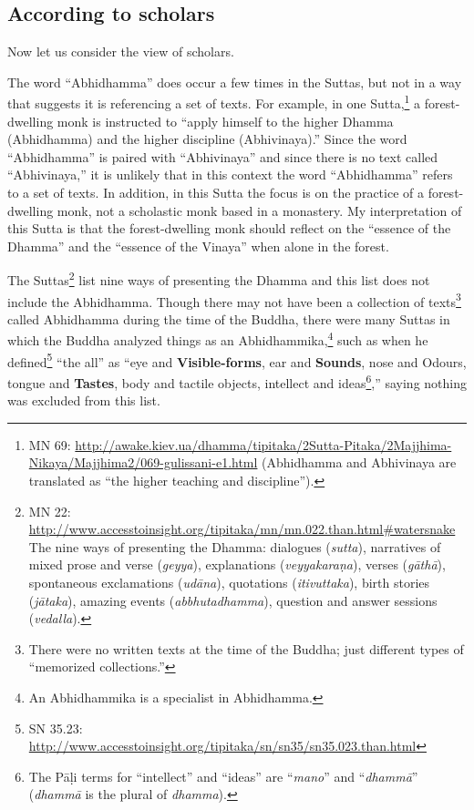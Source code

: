 \subsection*{According to scholars}

Now let us consider the view of scholars. 

The word “Abhidhamma” does occur a few times in the Suttas, but not in a way that suggests it is referencing a set of texts. For example, in one Sutta,\footnote{MN 69: \url{http://awake.kiev.ua/dhamma/tipitaka/2Sutta-Pitaka/2Majjhima-Nikaya/Majjhima2/069-gulissani-e1.html} (Abhidhamma and Abhivinaya are translated as “the higher teaching and discipline”).} a forest-dwelling monk is instructed to “apply himself to the higher Dhamma (Abhidhamma) and the higher discipline (Abhivinaya).” Since the word “Abhidhamma” is paired with “Abhivinaya” and since there is no text called “Abhivinaya,” it is unlikely that in this context the word “Abhidhamma” refers to a set of texts. In addition, in this Sutta the focus is on the practice of a forest-dwelling monk, not a scholastic monk based in a monastery. My interpretation of this Sutta is that the forest-dwelling monk should reflect on the “essence of the Dhamma” and the “essence of the Vinaya” when alone in the forest.

The Suttas\footnote{MN 22: \url{http://www.accesstoinsight.org/tipitaka/mn/mn.022.than.html\#watersnake}\\The nine ways of presenting the Dhamma: dialogues (\textit{sutta}), narratives of mixed prose and verse (\textit{geyya}), explanations (\textit{veyyakaraṇa}), verses (\textit{gāthā}), spontaneous exclamations (\textit{udāna}), quotations (\textit{itivuttaka}), birth stories (\textit{jātaka}), amazing events (\textit{abbhutadhamma}), question and answer sessions (\textit{vedalla}).} list nine ways of presenting the Dhamma and this list does not include the Abhidhamma. Though there may not have been a collection of texts\footnote{There were no written texts at the time of the Buddha; just different types of “memorized collections.”} called Abhidhamma during the time of the Buddha, there were many Suttas in which the Buddha analyzed things as an Abhidhammika,\footnote{An Abhidhammika is a specialist in Abhidhamma.} such as when he defined\footnote{SN 35.23: \url{http://www.accesstoinsight.org/tipitaka/sn/sn35/sn35.023.than.html}} “the all” as “eye and \textbf{Visible-forms}, ear and \textbf{Sounds}, nose and Odours, tongue and \textbf{Tastes}, body and tactile objects, intellect and ideas\footnote{The Pāḷi terms for “intellect” and “ideas” are “\textit{mano}” and “\textit{dhammā}” (\textit{dhammā} is the plural of \textit{dhamma}).},” saying nothing was excluded from this list. 

